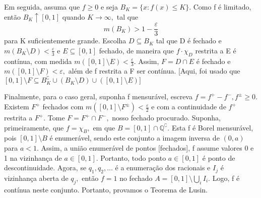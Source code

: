 \documentclass[measure_theory.tex]{subfiles}
\begin{document}
\begin{proof*}
	Em seguida, assuma que \(f\geq 0\) e seja \(B_{K} = \{x: f(x) \leq K\}.\) Como f é limitado, então \(B_{K}\uparrow [0, 1]\) quando \(K\to \infty,\) tal que
	\[
		m(B_{K}) > 1 - \frac{\varepsilon }{3}
	\]
	para K suficientemente grande. Escolha \(D\subseteq B_{K}\) tal que D é fechado e \(m(B_{K}\setminus{D}) < \frac{\varepsilon }{3}\) e \(E\subseteq [0, 1]\) fechado, de maneira que
	\(f \cdot \chi_{D}\) restrita a E é contínua, com medida \(m([0, 1]\setminus{E}) < \frac{\varepsilon }{3}.\) Assim, \(F = D\cap E\) é fechado e \(m([0, 1]\setminus{F}) < \varepsilon ,\)
	além de f restrita a F ser contínua. [Aqui, foi usado que \([0,1]\setminus{F}\subseteq B_{K}^{\complement}\cup (B_{K}\setminus{D})\cup ([0, 1]\setminus{E})]\)

	Finalmente, para o caso geral, suponha f mensurável, escreva \(f = f^{+} - f^{-}, f^{\pm} \geq 0.\) Existem \(F^{+}\) fechados com \(m([0, 1]\setminus{F^{\pm}}) < \frac{\varepsilon }{2}\) e com a continuidade
	de \(f^{+}\) restrita a \(F^{+}.\) Tome \(F = F^{+}\cap F^{-},\) nosso fechado procurado. Suponha, primeiramente, que \(f=\chi_{B},\) em que \(B = [0, 1]\cap \mathbb{Q}^{\complement}.\) Esta f é Borel mensurável, pois
	\([0, 1]\setminus{B}\) é enumerável, sendo este conjunto a imagem inversa de \((0, a)\) para \(a < 1\). Assim, a união enumerável de pontos [fechados], f assume valores 0 e 1 na vizinhança de \(a\in [0, 1].\) Portanto,
	todo ponto \(a\in [0, 1]\) é ponto de descontinuidade. Agora, se \(q_1, q_2, \dotsc \) é a enumeração dos racionais e \(I_{j}\) é vizinhança aberta de \(q_{j},\) então \(f=1\) no fechado \(A = [0, 1]\setminus{\bigcup_{i}^{}I_{i}.}\)
	Logo, f é contínua neste conjunto. Portanto, provamos o Teorema de Lusin.
\end{proof*}
\end{document}
